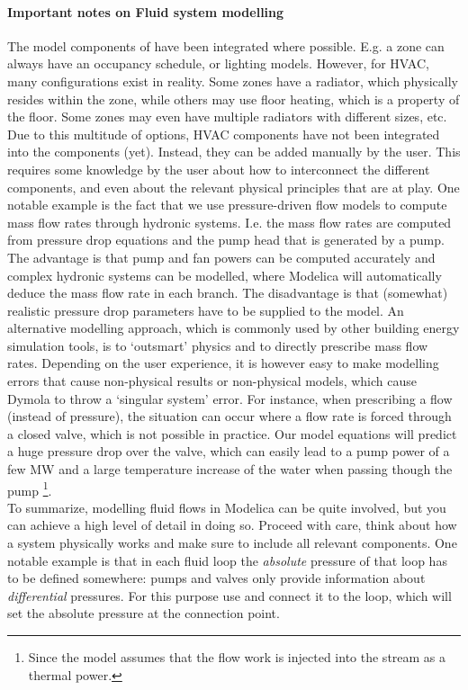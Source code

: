 \documentclass[10pt,a4paper]{article}
\begin{document}
\paragraph{Important notes on Fluid system modelling}
The model components of  have been integrated where possible.
E.g. a zone can always have an occupancy schedule, or lighting models. 
However, for HVAC, many configurations exist in reality. 
Some zones have a radiator, which physically resides within the zone, 
while others may use floor heating, which is a property of the floor.
Some zones may even have multiple radiators with different sizes, etc.
Due to this multitude of options, HVAC components have not been integrated into
the  components (yet).
Instead, they can be added manually by the user.
This requires some knowledge by the user about how to interconnect the different components, 
and even about the relevant physical principles that are at play.
One notable example is the fact that we use pressure-driven flow models 
to compute mass flow rates through hydronic systems. 
I.e. the mass flow rates are computed from pressure drop equations
and the pump head that is generated by a pump.
The advantage is that 
pump and fan powers can be computed accurately and 
complex hydronic systems can be modelled, 
where Modelica will automatically deduce the mass flow rate in each branch.
The disadvantage is that (somewhat) realistic pressure drop parameters have to be supplied
to the model.
An alternative modelling approach, which is commonly used by other building energy simulation tools, 
is to `outsmart' physics and to directly prescribe mass flow rates.
Depending on the user experience, it is however easy to make modelling errors that cause
non-physical results or non-physical models, which cause Dymola to throw a `singular system' error.
For instance, when prescribing a flow (instead of pressure),
the situation can occur where a flow rate is forced
through a closed valve, which is not possible in practice. 
Our model equations will predict a huge
pressure drop over the valve, which can easily lead to a pump power 
of a few MW and a large
temperature increase of the water when passing though the pump
\footnote{Since the model assumes that the flow work 
is injected into the stream as a thermal power.}.\\

To summarize, modelling fluid flows in Modelica can be quite involved,
but you can achieve a high level of detail in doing so.
Proceed with care, think about how a system physically works and make sure to 
include all relevant components.
One notable example is that in each fluid loop the 
\textit{absolute} pressure of that loop has to be defined somewhere: 
pumps and valves only provide information
about \textit{differential} pressures. 
For this purpose use  and connect
it to the loop, which will set the absolute pressure at the connection point.
\end{document}
